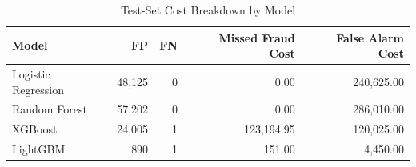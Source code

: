 \begin{table}[H]
\centering
\caption{Test-Set Cost Breakdown by Model}
\label{tab:test_cost_breakdown}
\begin{tabular}{lrrrr}
\hline
\textbf{Model} & \textbf{FP} & \textbf{FN} & \textbf{Missed Fraud Cost} & \textbf{False Alarm Cost} \\
\hline
Logistic Regression & 48,125 & 0 & 0.00 & 240,625.00 \\
Random Forest & 57,202 & 0 & 0.00 & 286,010.00 \\
XGBoost & 24,005 & 1 & 123,194.95 & 120,025.00 \\
LightGBM & 890 & 1 & 151.00 & 4,450.00 \\
\hline
\end{tabular}
\end{table}